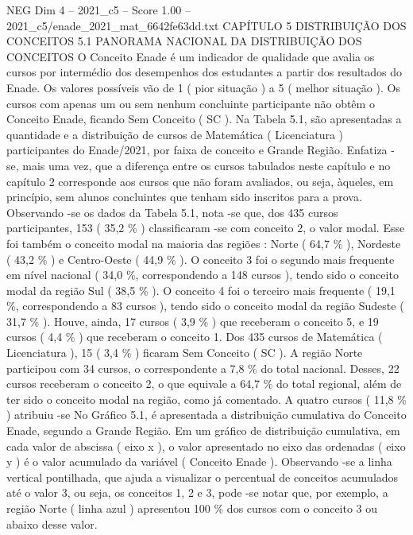 \begin{textsample}{NEG Dim 4 – 2021\_c5 – Score 1.00 – 2021\_c5/enade\_2021\_mat\_6642fe63dd.txt}  \label{ex:f4_neg_142}
CAPÍTULO 5 DISTRIBUIÇÃO DOS CONCEITOS 5.1 PANORAMA NACIONAL DA DISTRIBUIÇÃO DOS CONCEITOS O Conceito Enade é um indicador de qualidade que avalia os cursos por intermédio dos desempenhos dos estudantes a partir dos resultados do Enade.
Os valores possíveis vão de 1 ( pior situação ) a 5 ( melhor situação ).
Os cursos com apenas um ou sem nenhum concluinte participante não obtêm o Conceito Enade, ficando Sem Conceito ( SC ).
Na Tabela 5.1, são apresentadas a quantidade e a distribuição de cursos de Matemática ( Licenciatura ) participantes do Enade/2021, por faixa de conceito e Grande Região.
Enfatiza -se, mais uma vez, que a diferença entre os cursos tabulados neste capítulo e no capítulo 2 corresponde aos cursos que não foram avaliados, ou seja, àqueles, em princípio, sem alunos concluintes que tenham sido inscritos para a prova.
Observando -se os dados da Tabela 5.1, nota -se que, dos 435 cursos participantes, 153 ( 35,2 \% ) classificaram -se com conceito 2, o valor modal.
Esse foi também o conceito modal na maioria das regiões : Norte ( 64,7 \% ), Nordeste ( 43,2 \% ) e Centro-Oeste ( 44,9 \% ).
O conceito 3 foi o segundo mais frequente em nível nacional ( 34,0 \%, correspondendo a 148 cursos ), tendo sido o conceito modal da região Sul ( 38,5 \% ).
O conceito 4 foi o terceiro mais frequente ( 19,1 \%, correspondendo a 83 cursos ), tendo sido o conceito modal da região Sudeste ( 31,7 \% ).
Houve, ainda, 17 cursos ( 3,9 \% ) que receberam o conceito 5, e 19 cursos ( 4,4 \% ) que receberam o conceito 1.
Dos 435 cursos de Matemática ( Licenciatura ), 15 ( 3,4 \% ) ficaram Sem Conceito ( SC ).
A região Norte participou com 34 cursos, o correspondente a 7,8 \% do total nacional.
Desses, 22 cursos receberam o conceito 2, o que equivale a 64,7 \% do total regional, além de ter sido o conceito modal na região, como já comentado.
A quatro cursos ( 11,8 \% ) atribuiu -se No Gráfico 5.1, é apresentada a distribuição cumulativa do Conceito Enade, segundo a Grande Região.
Em um gráfico de distribuição cumulativa, em cada valor de abscissa ( eixo x ), o valor apresentado no eixo das ordenadas ( eixo y ) é o valor acumulado da variável ( Conceito Enade ).
Observando -se a linha vertical pontilhada, que ajuda a visualizar o percentual de conceitos acumulados até o valor 3, ou seja, os conceitos 1, 2 e 3, pode -se notar que, por exemplo, a região Norte ( linha azul ) apresentou 100 \% dos cursos com o conceito 3 ou abaixo desse valor.

\end{textsample}
